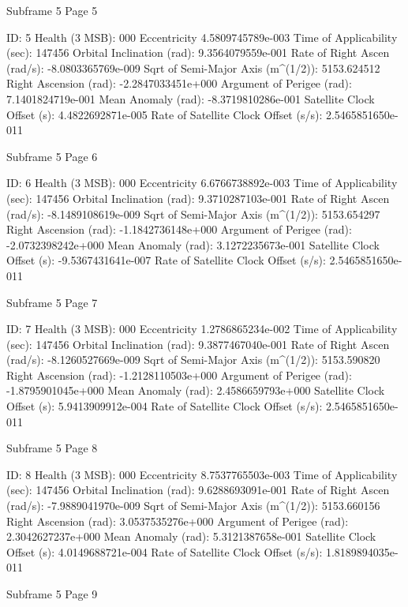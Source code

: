  Subframe  5 Page  5

 ID:				      5
 Health (3 MSB):		     000
 Eccentricity			     4.5809745789e-003
 Time of Applicability (sec):	       147456
 Orbital Inclination (rad):	     9.3564079559e-001
 Rate of Right Ascen (rad/s):	     -8.0803365769e-009
 Sqrt of Semi-Major Axis (m^(1/2)):  5153.624512
 Right Ascension (rad): 	     -2.2847033451e+000
 Argument of Perigee (rad):	     7.1401824719e-001
 Mean Anomaly (rad):		     -8.3719810286e-001
 Satellite Clock Offset (s):	     4.4822692871e-005
 Rate of Satellite Clock Offset (s/s): 2.5465851650e-011

 Subframe  5 Page  6

 ID:				      6
 Health (3 MSB):		     000
 Eccentricity			     6.6766738892e-003
 Time of Applicability (sec):	       147456
 Orbital Inclination (rad):	     9.3710287103e-001
 Rate of Right Ascen (rad/s):	     -8.1489108619e-009
 Sqrt of Semi-Major Axis (m^(1/2)):  5153.654297
 Right Ascension (rad): 	     -1.1842736148e+000
 Argument of Perigee (rad):	     -2.0732398242e+000
 Mean Anomaly (rad):		     3.1272235673e-001
 Satellite Clock Offset (s):	     -9.5367431641e-007
 Rate of Satellite Clock Offset (s/s): 2.5465851650e-011

 Subframe  5 Page  7

 ID:				      7
 Health (3 MSB):		     000
 Eccentricity			     1.2786865234e-002
 Time of Applicability (sec):	       147456
 Orbital Inclination (rad):	     9.3877467040e-001
 Rate of Right Ascen (rad/s):	     -8.1260527669e-009
 Sqrt of Semi-Major Axis (m^(1/2)):  5153.590820
 Right Ascension (rad): 	     -1.2128110503e+000
 Argument of Perigee (rad):	     -1.8795901045e+000
 Mean Anomaly (rad):		     2.4586659793e+000
 Satellite Clock Offset (s):	     5.9413909912e-004
 Rate of Satellite Clock Offset (s/s): 2.5465851650e-011

 Subframe  5 Page  8

 ID:				      8
 Health (3 MSB):		     000
 Eccentricity			     8.7537765503e-003
 Time of Applicability (sec):	       147456
 Orbital Inclination (rad):	     9.6288693091e-001
 Rate of Right Ascen (rad/s):	     -7.9889041970e-009
 Sqrt of Semi-Major Axis (m^(1/2)):  5153.660156
 Right Ascension (rad): 	     3.0537535276e+000
 Argument of Perigee (rad):	     2.3042627237e+000
 Mean Anomaly (rad):		     5.3121387658e-001
 Satellite Clock Offset (s):	     4.0149688721e-004
 Rate of Satellite Clock Offset (s/s): 1.8189894035e-011

 Subframe  5 Page  9

